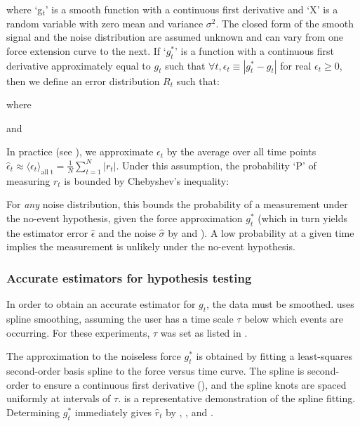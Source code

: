 where `g$_t$' is a smooth function with a continuous first derivative and `X' is a random variable with zero mean and variance $\sigma^2$. The closed form of the smooth signal and the noise distribution are assumed unknown and can vary from one force extension curve to the next. If `$g^{*}_t$' is a function with a continuous first derivative approximately equal to $g_t$ such that $\forall t,\epsilon_t\equiv|g^{*}_t-g_t|$ for real $\epsilon_t\ge 0$, then we define an error distribution $R_t$ such that: \pl


where


and 


In practice (see ), we approximate $\epsilon_t$ by the average over all time points $\hat{\epsilon}_t \approx \langle \epsilon_t \rangle_{\text{all t}} = \frac{1}{N} \sum_{t=1}^N |r_t|$. Under this assumption, the probability `P' of measuring $r_t$ is bounded by Chebyshev's inequality:



For \emph{any} noise distribution, this bounds the probability of a measurement under the no-event hypothesis, given the force approximation $g^{*}_t$ (which in turn yields the estimator error $\hat{\epsilon}$ and the noise $\hat{\sigma}$ by  and ). A low probability at a given time implies the measurement is unlikely under the no-event hypothesis. \pl

\subsubsection{Accurate estimators for hypothesis testing}

\firstp In order to obtain an accurate estimator for $g_t$, the data must be smoothed. \name{} uses spline smoothing, assuming the user has a time scale $\tau$ below which events are occurring. For these experiments, $\tau$ was set as listed in . \pl 

The approximation to the noiseless force $g^{*}_t$ is obtained by fitting a least-squares second-order basis spline to the force versus time curve. The spline is second-order to ensure a continuous first derivative (), and the spline knots are spaced uniformly at intervals of $\tau$.  is a representative demonstration of the spline fitting. Determining  $g^{*}_t$ immediately gives $\hat{r}_t$ by  , , and . \pl

